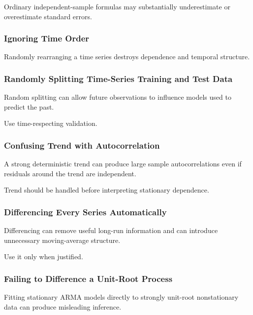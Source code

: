 Ordinary independent-sample formulas may substantially underestimate or
overestimate standard errors.

\subsubsection{Ignoring Time Order}

Randomly rearranging a time series destroys dependence and temporal
structure.

\subsubsection{Randomly Splitting Time-Series Training and Test Data}

Random splitting can allow future observations to influence models used
to predict the past.

Use time-respecting validation.

\subsubsection{Confusing Trend with Autocorrelation}

A strong deterministic trend can produce large sample autocorrelations
even if residuals around the trend are independent.

Trend should be handled before interpreting stationary dependence.

\subsubsection{Differencing Every Series Automatically}

Differencing can remove useful long-run information and can introduce
unnecessary moving-average structure.

Use it only when justified.

\subsubsection{Failing to Difference a Unit-Root Process}

Fitting stationary ARMA models directly to strongly unit-root
nonstationary data can produce misleading inference.

